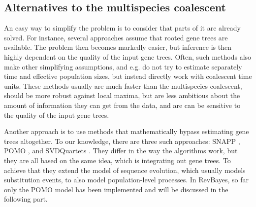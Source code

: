 \documentclass[11pt]{article}
\begin{document}
\subsection{Alternatives to the multispecies coalescent}
An easy way to simplify the problem is to consider that parts of it are already solved.
For instance, several approaches assume that rooted gene trees are available.
The problem then becomes markedly easier, but inference is then highly dependent on the quality of the input gene trees. 
Often, such methods also make other simplifying assumptions, and e.g. do not try to estimate separately time and effective population sizes, but instead directly work with coalescent time units.
These methods usually are much faster than the multispecies coalescent, should be more robust against local maxima, but are less ambitious about the amount of information they can get from the data, and are can be sensitive to the quality of the input gene trees.

Another approach is to use methods that mathematically bypass estimating gene trees altogether.
To our knowledge, there are three such approaches: SNAPP \citep{Bryant2012}, POMO \citep{DeMaio2013}, and SVDQuartets \citep{Chifman2014}.
They differ in the way the algorithms work, but they are all based on the same idea, which is integrating out gene trees.
To achieve that they extend the model of sequence evolution, which usually models substitution events, to also model population-level processes.
In RevBayes, so far only the POMO model has been implemented and will be discussed in the following part.
\end{document}
